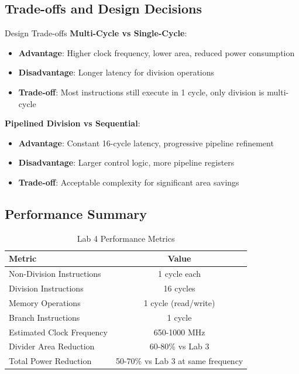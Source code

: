 \documentclass[a4paper, 11pt]{article}
\begin{document}
\subsection{Trade-offs and Design Decisions}

\begin{myblock}{Design Trade-offs}
\textbf{Multi-Cycle vs Single-Cycle}:
\begin{itemize}
    \item \textbf{Advantage}: Higher clock frequency, lower area, reduced power consumption
    \item \textbf{Disadvantage}: Longer latency for division operations
    \item \textbf{Trade-off}: Most instructions still execute in 1 cycle, only division is multi-cycle
\end{itemize}

\textbf{Pipelined Division vs Sequential}:
\begin{itemize}
    \item \textbf{Advantage}: Constant 16-cycle latency, progressive pipeline refinement
    \item \textbf{Disadvantage}: Larger control logic, more pipeline registers
    \item \textbf{Trade-off}: Acceptable complexity for significant area savings
\end{itemize}
\end{myblock}

\subsection{Performance Summary}

\begin{table}[H]
\centering
\caption{Lab 4 Performance Metrics}
\begin{tabular}{|l|c|}
\hline
\textbf{Metric} & \textbf{Value} \\
\hline
Non-Division Instructions & 1 cycle each \\
\hline
Division Instructions & 16 cycles \\
\hline
Memory Operations & 1 cycle (read/write) \\
\hline
Branch Instructions & 1 cycle \\
\hline
Estimated Clock Frequency & 650-1000 MHz \\
\hline
Divider Area Reduction & 60-80\% vs Lab 3 \\
\hline
Total Power Reduction & 50-70\% vs Lab 3 at same frequency \\
\hline
\end{tabular}
\end{table}
\end{document}
